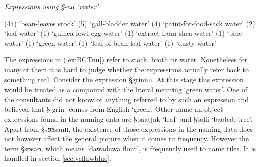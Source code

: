 \begin{exe}
 \ex\label{ex:BCTnɪɪ}\textit{Expressions using {\S -nɪɪ} `water'}

\begin{xlist}
  (44)   `bean-leaves stock'  
  (5)   `gall-bladder water' 
 (4)   `paint-for-food-sack water'   
  (2)  `leaf water'  
  (1)   `guinea-fowl-egg water' 
  (1)  `extract-from-shea water'  
  (1)  `blue water' 
  (1)  `green water' 
  (1)  `leaf of bean-leaf water' 
  (1)  `dusty water' 

\end{xlist}
\end{exe}



The  expressions in (\ref{ex:BCTnɪɪ})
refer to stock, broth or water.  Nonetheless for many of them it is hard to
judge
whether the expressions actually refer back to something real. Consider the
expression {\S grinnɪɪ}. At this stage this expression would be treated as a
compound with the literal meaning `green water'. One of the consultants did
not know of
anything referred to by such an expression and  believed that {\S
grin-} comes from English `green'. Other name-an-object expressions  found in
the naming data are {\S paatʃak} `leaf' and  {\S tolii}   `baobab tree'. Apart
from {\S sʊɔsanɪɪ}, the existence of those expressions in the naming data does
not however affect the general picture when it comes to frequency. However the
term {\S sʊsaʊ}, which  means `dawadawa flour', is frequently  used to name
tiles. It is handled in section \ref{sec:yellowblue}.


